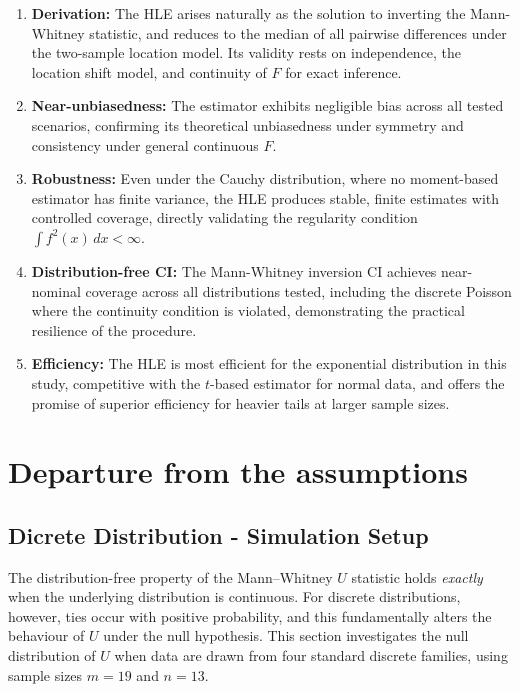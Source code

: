 \documentclass[10pt]{article}
\begin{document}
\begin{enumerate}
    \item \textbf{Derivation:} The HLE arises naturally as the solution to inverting the Mann-Whitney statistic, and reduces to the median of all pairwise differences under the two-sample location model. Its validity rests on independence, the location shift model, and continuity of $F$ for exact inference.

    \item \textbf{Near-unbiasedness:} The estimator exhibits negligible bias across all tested scenarios, confirming its theoretical unbiasedness under symmetry and consistency under general continuous $F$.

    \item \textbf{Robustness:} Even under the Cauchy distribution, where no moment-based estimator has finite variance, the HLE produces stable, finite estimates with controlled coverage, directly validating the regularity condition $\int f^2(x)\,dx < \infty$.

    \item \textbf{Distribution-free CI:} The Mann-Whitney inversion CI achieves near-nominal coverage across all distributions tested, including the discrete Poisson where the continuity condition is violated, demonstrating the practical resilience of the procedure.

    \item \textbf{Efficiency:} The HLE is most efficient for the exponential distribution in this study, competitive with the $t$-based estimator for normal data, and offers the promise of superior efficiency for heavier tails at larger sample sizes.
\end{enumerate}

\section{Departure from the assumptions}
\subsection{Dicrete Distribution - Simulation Setup}
The distribution-free property of the Mann--Whitney $U$ statistic
holds \emph{exactly} when the underlying distribution is continuous.
For discrete distributions, however, ties occur with positive
probability, and this fundamentally alters the behaviour of $U$
under the null hypothesis. This section investigates the null
distribution of $U$ when data are drawn from four standard discrete
families, using sample sizes $m = 19$ and $n = 13$.
\end{document}
